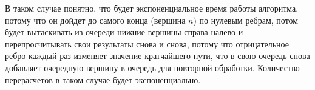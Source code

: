 \begin{enumerate}
\begin{enumerate}
\begin{solution}
        В таком случае понятно, что будет экспоненциальное время работы алгоритма, потому что он дойдет до самого конца (вершина $n$) по нулевым ребрам, потом будет вытаскивать из очереди нижние вершины справа налево и перепросчитывать свои результаты снова и снова, потому что отрицательное ребро каждый раз изменяет значение кратчайшего пути, что в свою очередь снова добавляет очередную вершину в очередь для повторной обработки. Количество перерасчетов в таком случае будет экспоненциально.
      \end{solution}
    \end{enumerate}



\end{enumerate}
